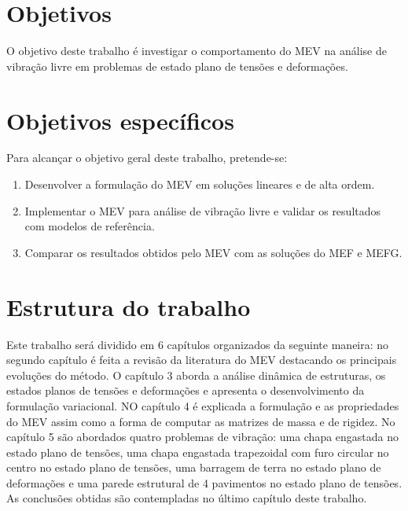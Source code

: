 \section{Objetivos}

\indent O objetivo deste trabalho é investigar o comportamento do MEV na análise de vibração 
livre em problemas de estado plano de tensões e deformações.

\section{Objetivos específicos}

\indent Para alcançar o objetivo geral deste trabalho, pretende-se:

\begin{enumerate}
    \item Desenvolver a formulação do MEV em soluções lineares e de alta ordem.
    \item Implementar o MEV para análise de vibração livre e validar os resultados com modelos de referência.
    \item Comparar os resultados obtidos pelo MEV com as soluções do MEF e MEFG.
\end{enumerate}

\section{Estrutura do trabalho}

\indent Este trabalho será dividido em 6 capítulos organizados da seguinte maneira: no segundo capítulo é feita a revisão da literatura do MEV destacando os principais evoluções do método. O capítulo 3 aborda a análise dinâmica de estruturas, os estados planos de tensões e deformações e apresenta o desenvolvimento da formulação variacional. NO capítulo 4 é explicada a formulação e as propriedades do MEV assim como a forma de computar as matrizes de massa e de rigidez. No capítulo 5 são abordados quatro problemas de vibração: uma chapa engastada no estado plano de tensões, uma chapa engastada trapezoidal com furo circular no centro no estado plano de tensões, uma barragem de terra no estado plano de deformações e uma parede estrutural de 4 pavimentos no estado plano de tensões. As conclusões obtidas são contempladas no último capítulo deste trabalho.











